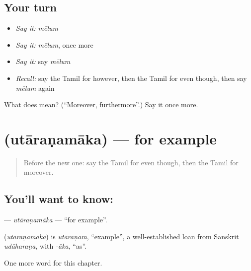 \subsection*{Your turn}
\begin{itemize}
\raggedright
  \item \emph{Say it:} \emph{mēlum}
  \item \emph{Say it:} \emph{mēlum}, once more
  \item \emph{Say it:} say \emph{mēlum}
  \item \emph{Recall:} say the Tamil for however, then the Tamil for even though, then say \emph{mēlum} again
\end{itemize}

\begin{tcolorbox}[breakable,colback=teal!4,colframe=teal!35!black,title={Before you move on}]
What does  mean? (\textquotedblleft{}Moreover, furthermore\textquotedblright{}.) Say it once more.
\end{tcolorbox}
\section[\texorpdfstring{\ta{உதாரணமாக} (utāraṇamāka)}{உதாரணமாக (utāraṇamāka)}]{ (utāraṇamāka) — for example}

\label{lesson:TA-C176-utaranamaka}



\begin{quote}
Before the new one: say the Tamil for even though, then the Tamil for moreover.
\end{quote}

\subsection*{You'll want to know: }
\textbf{} — \emph{utāraṇamāka} — \textquotedblleft{}for example\textquotedblright{}.

\begin{cousinweb}
\textbf{} (\emph{utāraṇamāka}) is \emph{utāraṇam}, \textquotedblleft{}example\textquotedblright{}, a well-established loan from Sanskrit \emph{udāharaṇa}, with \emph{-āka}, \textquotedblleft{}as\textquotedblright{}.
\end{cousinweb}

\begin{grammarlens}[title={What you've built}]
One more word for this chapter.
\end{grammarlens}

